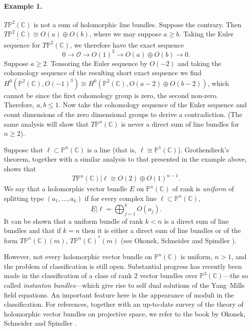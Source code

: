 \paragraph{Example 1.} $T\mathbb{P}^2(\mathbb{C})$ is not a sum of holomorphic line bundles. Suppose the contrary. Then $\underline{T\mathbb{P}^2(\mathbb{C})}\cong O(a)\oplus O(b)$, where we may suppose $a\geq b$. Taking the Euler sequence for $T\mathbb{P}^2(\mathbb{C})$, we therefore have the exact sequence
\[
0\to\mathcal{O}\to O(1)^3\to O(a)\oplus O(b)\to0.
\]
Suppose $a\geq2$. Tensoring the Euler sequence by $O(-2)$ and taking the cohomology sequence of the resulting short exact sequence we find $H^0(\mathbb{P}^2(\mathbb{C}),O(-1)^3)\cong H^0(\mathbb{P}^2(\mathbb{C}),O(a-2)\oplus O(b-2))$, which cannot be since the first cohomology group is zero, the second non-zero. Therefore, $a,b\leq1$. Now take the cohomology sequence of the Euler sequence and count dimensions of the zero dimensional groups to derive a contradiction. (The same analysis will show that $T\mathbb{P}^n(\mathbb{C})$ is never a direct sum of line bundles for $n\geq2$).

Suppose that $\ell\subset\mathbb{P}^n(\mathbb{C})$ is a line (that is, $\ell\cong\mathbb{P}^1(\mathbb{C})$). Grothendieck's theorem, together with a similar analysis to that presented in the example above, shows that
\[
\underline{T\mathbb{P}^n(\mathbb{C})}|\ell\cong O(2)\oplus O(1)^{n-1}.
\]
We say that a holomorphic vector bundle $E$ on $\mathbb{P}^n(\mathbb{C})$ of rank is \emph{uniform} of splitting type $(a_1,\ldots,a_k)$ if for every complex line $\ell\subset\mathbb{P}^n(\mathbb{C})$,
\[
\underline{E}|\ell=\bigoplus_{j=1}^k O(a_j).
\]
It can be shown that a uniform bundle of rank $k<n$ is a direct sum of line bundles and that if $k=n$ then it is either a direct sum of line bundles or of the form $T\mathbb{P}^n(\mathbb{C})(m)$, $T\mathbb{P}^n(\mathbb{C})^*(m)$ (see Okonek, Schneider and Spindler \cite[pages 70,71]{bib:II:okonek-c-schneider-m-and-spindler-h:1}).

However, not every holomorphic vector bundle on $\mathbb{P}^n(\mathbb{C})$ is uniform, $n>1$, and the problem of classification is still open. Substantial progress has recently been made in the classification of a class of rank 2 vector bundles over $\mathbb{P}^3(\mathbb{C})$---the so called \emph{instanton bundles}---which give rise to self dual solutions of the Yang--Mills field equations. An important feature here is the appearance of moduli in the classification. For references, together with an up-to-date survey of the theory of holomorphic vector bundles on projective space, we refer to the book by Okonek, Schneider and Spindler \cite{bib:II:okonek-c-schneider-m-and-spindler-h:1}.

